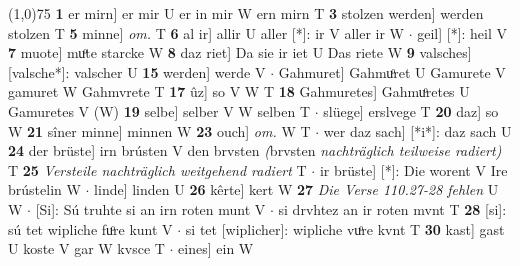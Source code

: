\documentclass[8pt,a4paper,notitlepage]{article}
\begin{document}
\begin{table}[ht]
\begin{minipage}[t]{0.5\linewidth}
\line(1,0){75} \newline
\textbf{1} er mirn] er mir U er in mir W ern mirn T \textbf{3} stolzen werden] werden stolzen T \textbf{5} minne] \textit{om.} T \textbf{6} al ir] allir U aller [*]: ir V aller ir W  $\cdot$ geil] [*]: heil V \textbf{7} muote] muͦte starcke W \textbf{8} daz riet] Da sie ir iet U Das riete W \textbf{9} valsches] [valsche*]: valscher U \textbf{15} werden] werde V  $\cdot$ Gahmuret] Gahmuͦret U Gamurete V gamuret W Gahmvrete T \textbf{17} ûz] so V W T \textbf{18} Gahmuretes] Gahmuͦretes U Gamuretes V (W) \textbf{19} selbe] selber V W selben T  $\cdot$ slüege] erslvege T \textbf{20} daz] so W \textbf{21} sîner minne] minnen W \textbf{23} ouch] \textit{om.} W T  $\cdot$ wer daz sach] [*i*]: daz sach U \textbf{24} der brüste] irn brústen V den brvsten \textit{(}brvsten \textit{nachträglich teilweise radiert)} T \textbf{25} \textit{Versteile nachträglich weitgehend radiert} T   $\cdot$ ir brüste] [*]: Die worent V Ire brústelin W  $\cdot$ linde] linden U \textbf{26} kêrte] kert W \textbf{27} \textit{Die Verse 110.27-28 fehlen} U W   $\cdot$ [Si]: Sú truhte si an irn roten munt V  $\cdot$ si drvhtez an ir roten mvnt T \textbf{28} [si]: sú tet wipliche fuͦre kunt V  $\cdot$ si tet [wiplicher]: wipliche vuͦre kvnt T \textbf{30} kast] gast U koste V gar W kvsce T  $\cdot$ eines] ein W \newline
\end{minipage}
\end{table}
\end{document}
